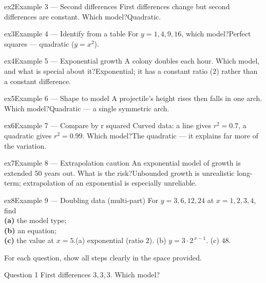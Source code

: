 \documentclass[11pt]{article}
\begin{document}
\begin{example}{ex2}{Example 3 --- Second differences}
First differences change but second differences are constant. Which model?\soln Quadratic.
\end{example}

\begin{example}{ex3}{Example 4 --- Identify from a table}
For $y=1,4,9,16$, which model?\soln Perfect squares --- quadratic ($y=x^{2}$).
\end{example}

\begin{example}{ex4}{Example 5 --- Exponential growth}
A colony doubles each hour. Which model, and what is special about it?\soln Exponential; it has a constant ratio ($2$) rather than a constant difference.
\end{example}

\begin{example}{ex5}{Example 6 --- Shape to model}
A projectile's height rises then falls in one arch. Which model?\soln Quadratic --- a single symmetric arch.
\end{example}

\begin{example}{ex6}{Example 7 --- Compare by r squared}
Curved data: a line gives $r^{2}=0.7$, a quadratic gives $r^{2}=0.99$. Which model?\soln The quadratic --- it explains far more of the variation.
\end{example}

\begin{example}{ex7}{Example 8 --- Extrapolation caution}
An exponential model of growth is extended 50 years out. What is the risk?\soln Unbounded growth is unrealistic long-term; extrapolation of an exponential is especially unreliable.
\end{example}

\begin{example}{ex8}{Example 9 --- Doubling data (multi-part)}
For $y=3,6,12,24$ at $x=1,2,3,4$, find \\ \textbf{(a)} the model type; \\ \textbf{(b)} an equation; \\ \textbf{(c)} the value at $x=5$.\soln (a) exponential (ratio $2$). (b) $y=3\cdot2^{\,x-1}$. (c) $48$.
\end{example}

\clearpage
{}
For each question, show all steps clearly in the space provided.

\begin{qbox}{Question 1}
First differences $3,3,3$. Which model?\workspace{2.4cm}
\end{qbox}
\end{document}
